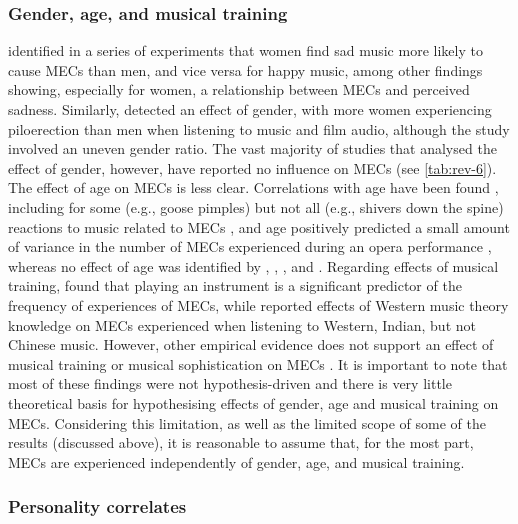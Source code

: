 \subsubsection{Gender, age, and musical training}

\textcite{panksepp1995} identified in a series of experiments that women find sad music more likely to cause MECs than men, and vice versa for happy music, among other findings showing, especially for women, a relationship between MECs and perceived sadness. Similarly, \textcite{benedek2011} detected an effect of gender, with more women experiencing piloerection than men when listening to music and film audio, although the study involved an uneven gender ratio. The vast majority of studies that analysed the effect of gender, however, have reported no influence on MECs (see \autoref{tab:rev-6}). The effect of age on MECs is less clear. Correlations with age have been found \parencite{williams2018}, including for some (e.g., goose pimples) but not all (e.g., shivers down the spine) reactions to music related to MECs \parencite{mlejnek2013}, and age positively predicted a small amount of variance in the number of MECs experienced during an opera performance \parencite{baltes2014}, whereas no effect of age was identified by \textcite{grewe2009a}, \textcite{mori2014b}, \textcite{starcke2019}, and \textcite{zickfeld2019a}. Regarding effects of musical training, \textcite{nusbaum2011} found that playing an instrument is a significant predictor of the frequency of experiences of MECs, while \textcite{beier2020} reported effects of Western music theory knowledge on MECs experienced when listening to Western, Indian, but not Chinese music. However, other empirical evidence does not support an effect of musical training or musical sophistication \parencite{mullensiefen2014} on MECs \parencite{bannister2018, grewe2009a, guhn2007, polo2017, rickard2004}. It is important to note that most of these findings were not hypothesis-driven and there is very little theoretical basis for hypothesising effects of gender, age and musical training on MECs. Considering this limitation, as well as the limited scope of some of the results (discussed above), it is reasonable to assume that, for the most part, MECs are experienced independently of gender, age, and musical training.

\subsubsection{Personality correlates}


